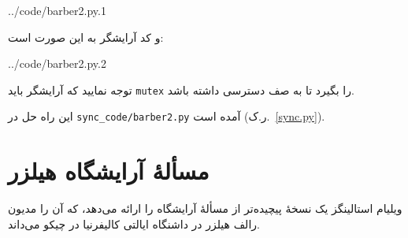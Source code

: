 \documentclass{book}
\newcommand{\clearemptydoublepage}{\newpage\cleardoublepage}
\begin{document}
\begin{latin}
%

{../code/barber2.py.1}
\end{latin}

	و کد آرایشگر به این صورت است:

\begin{latin}
%

{../code/barber2.py.2}
\end{latin}

	توجه نمایید که آرایشگر باید {\tt mutex} را بگیرد تا به صف دسترسی داشته باشد.

	این راه حل در \verb"sync_code/barber2.py" آمده است (ر.ک.~\ref{sync.py}).

\clearemptydoublepage
\section {مسألهٔ آرایشگاه هیلزر}

	ویلیام استالینگز \cite{stallings}  یک نسخهٔ پیچیده‌تر از مسألهٔ آرایشگاه را ارائه می‌دهد، 
	که آن را مدیون رالف هیلزر در داشنگاه ایالتی کالیفرنیا در چیکو می‌داند.
\end{document}
